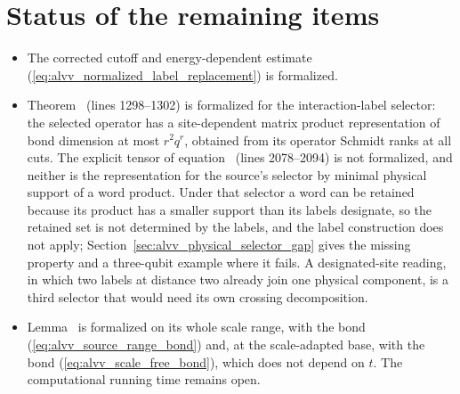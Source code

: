 \documentclass{article}
\begin{document}
\section{Status of the remaining items}
\label{sec:alvv_cluster_status}

\begin{itemize}
    \item The corrected cutoff and energy-dependent estimate
          (\ref{eq:alvv_normalized_label_replacement}) is formalized.
    \item Theorem~ (lines 1298--1302) is formalized for the
          interaction-label selector: the selected operator has a
          site-dependent matrix product representation of bond dimension at
          most $r^2q^r$, obtained from its operator Schmidt ranks at all cuts.
          The explicit tensor of equation~ (lines 2078--2094)
          is not formalized, and neither is the representation for the
          source's selector by minimal physical support of a word product.
          Under that selector a word can be retained because its product has
          a smaller support than its labels designate, so the retained set is
          not determined by the labels, and the label construction does not
          apply; Section~\ref{sec:alvv_physical_selector_gap} gives the missing
          property and a three-qubit example where it fails. A designated-site reading, in which two labels at distance
          two already join one physical component, is a third selector that
          would need its own crossing decomposition.
    \item Lemma~ is formalized on its whole scale
          range, with the bond (\ref{eq:alvv_source_range_bond}) and, at the
          scale-adapted base, with the bond (\ref{eq:alvv_scale_free_bond}),
          which does not depend on $t$. The computational running time
          remains open.
\end{itemize}




\end{document}
